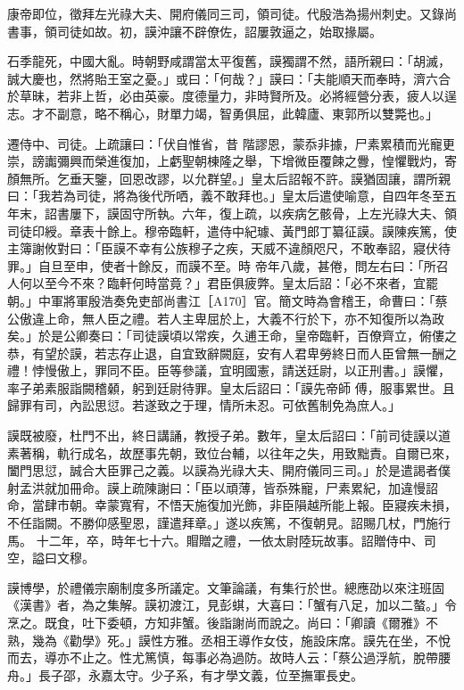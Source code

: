\begin{pinyinscope}
 康帝即位，徵拜左光祿大夫、開府儀同三司，領司徒。代殷浩為揚州刺史。又錄尚書事，領司徒如故。初，謨沖讓不辟僚佐，詔屢敦逼之，始取掾屬。



 石季龍死，中國大亂。時朝野咸謂當太平復舊，謨獨謂不然，語所親曰：「胡滅，誠大慶也，然將貽王室之憂。」或曰：「何哉？」謨曰：「夫能順天而奉時，濟六合於草昧，若非上哲，必由英豪。度德量力，非時賢所及。必將經營分表，疲人以逞志。才不副意，略不稱心，財單力竭，智勇俱屈，此韓廬、東郭所以雙斃也。」



 遷侍中、司徒。上疏讓曰：「伏自惟省，昔
 階謬恩，蒙忝非據，尸素累積而光寵更崇，謗讟彌興而榮進復加，上虧聖朝棟隆之舉，下增微臣覆餗之釁，惶懼戰灼，寄顏無所。乞垂天鑒，回恩改謬，以允群望。」皇太后詔報不許。謨猶固讓，謂所親曰：「我若為司徒，將為後代所哂，義不敢拜也。」皇太后遣使喻意，自四年冬至五年末，詔書屢下，謨固守所執。六年，復上疏，以疾病乞骸骨，上左光祿大夫、領司徒印綬。章表十餘上。穆帝臨軒，遣侍中紀璩、黃門郎丁纂征謨。謨陳疾篤，使主簿謝攸對曰：「臣謨不幸有公族穆子之疾，天威不違顏咫尺，不敢奉詔，寢伏待罪。」自旦至申，使者十餘反，而謨不至。時
 帝年八歲，甚倦，問左右曰：「所召人何以至今不來？臨軒何時當竟？」君臣俱疲弊。皇太后詔：「必不來者，宜罷朝。」中軍將軍殷浩奏免吏部尚書江［A170］官。簡文時為會稽王，命曹曰：「蔡公傲違上命，無人臣之禮。若人主卑屈於上，大義不行於下，亦不知復所以為政矣。」於是公卿奏曰：「司徒謨頃以常疾，久逋王命，皇帝臨軒，百僚齊立，俯僂之恭，有望於謨，若志存止退，自宜致辭闕庭，安有人君卑勞終日而人臣曾無一酬之禮！悖慢傲上，罪同不臣。臣等參議，宜明國憲，請送廷尉，以正刑書。」謨懼，率子弟素服詣闕稽顙，躬到廷尉待罪。皇太后詔曰：「謨先帝師
 傅，服事累世。且歸罪有司，內訟思愆。若遂致之于理，情所未忍。可依舊制免為庶人。」



 謨既被廢，杜門不出，終日講誦，教授子弟。數年，皇太后詔曰：「前司徒謨以道素著稱，軌行成名，故歷事先朝，致位台輔，以往年之失，用致黜責。自爾已來，闔門思愆，誠合大臣罪己之義。以謨為光祿大夫、開府儀同三司。」於是遣謁者僕射孟洪就加冊命。謨上疏陳謝曰：「臣以頑薄，皆忝殊寵，尸素累紀，加違慢詔命，當肆市朝。幸蒙寬宥，不悟天施復加光飾，非臣隕越所能上報。臣寢疾未損，不任詣闕。不勝仰感聖恩，謹遣拜章。」遂以疾篤，不復朝見。詔賜几杖，門施行馬。
 十二年，卒，時年七十六。賵贈之禮，一依太尉陸玩故事。詔贈侍中、司空，謚曰文穆。



 謨博學，於禮儀宗廟制度多所議定。文筆論議，有集行於世。總應劭以來注班固《漢書》者，為之集解。謨初渡江，見彭蜞，大喜曰：「蟹有八足，加以二螯。」令烹之。既食，吐下委頓，方知非蟹。後詣謝尚而說之。尚曰：「卿讀《爾雅》不熟，幾為《勸學》死。」謨性方雅。丞相王導作女伎，施設床席。謨先在坐，不悅而去，導亦不止之。性尤篤慎，每事必為過防。故時人云：「蔡公過浮航，脫帶腰舟。」長子邵，永嘉太守。少子系，有才學文義，位至撫軍長史。




\end{pinyinscope}
